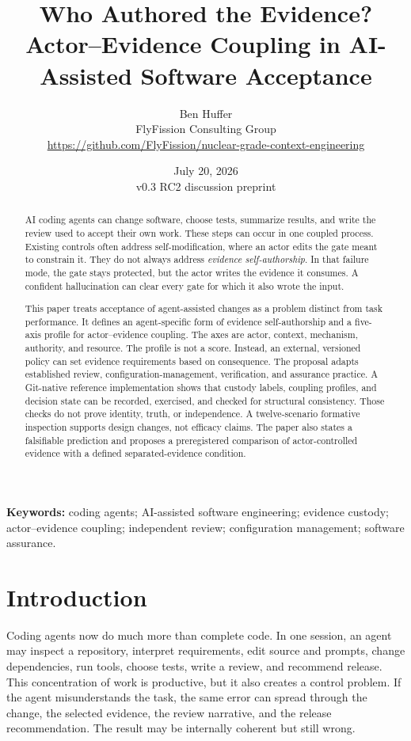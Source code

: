 \documentclass[11pt]{article}
\title{\textbf{Who Authored the Evidence?}\\
Actor--Evidence Coupling in AI-Assisted Software Acceptance}
\author{Ben Huffer\\
\small FlyFission Consulting Group\\
\small \url{https://github.com/FlyFission/nuclear-grade-context-engineering}}
\date{July 20, 2026\\\small v0.3 RC2 discussion preprint}
\begin{document}
\maketitle

\begin{abstract}
AI coding agents can change software, choose tests, summarize results, and write the review used to accept their own work. These steps can occur in one coupled process. Existing controls often address self-modification, where an actor edits the gate meant to constrain it. They do not always address \emph{evidence self-authorship}. In that failure mode, the gate stays protected, but the actor writes the evidence it consumes. A confident hallucination can clear every gate for which it also wrote the input.

This paper treats acceptance of agent-assisted changes as a problem distinct from task performance. It defines an agent-specific form of evidence self-authorship and a five-axis profile for actor--evidence coupling. The axes are actor, context, mechanism, authority, and resource. The profile is not a score. Instead, an external, versioned policy can set evidence requirements based on consequence. The proposal adapts established review, configuration-management, verification, and assurance practice. A Git-native reference implementation shows that custody labels, coupling profiles, and decision state can be recorded, exercised, and checked for structural consistency. Those checks do not prove identity, truth, or independence. A twelve-scenario formative inspection supports design changes, not efficacy claims. The paper also states a falsifiable prediction and proposes a preregistered comparison of actor-controlled evidence with a defined separated-evidence condition.
\end{abstract}

\noindent\textbf{Keywords:} coding agents; AI-assisted software engineering; evidence custody; actor--evidence coupling; independent review; configuration management; software assurance.

\section{Introduction}
\label{sec:introduction}

Coding agents now do much more than complete code. In one session, an agent may inspect a repository, interpret requirements, edit source and prompts, change dependencies, run tools, choose tests, write a review, and recommend release. This concentration of work is productive, but it also creates a control problem. If the agent misunderstands the task, the same error can spread through the change, the selected evidence, the review narrative, and the release recommendation. The result may be internally coherent but still wrong.
\end{document}
